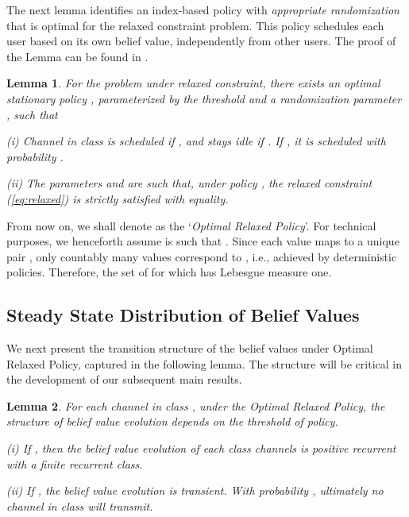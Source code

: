 \documentclass[11pt,twocolumn]{IEEEtran}
\newtheorem{lemma}{Lemma}
\begin{document}
The next lemma identifies an index-based policy with \emph{appropriate randomization} that is optimal for the relaxed constraint problem. This policy schedules each user based on its own belief value, independently from other users. The proof of the Lemma can be found in \cite{Zhao_index}.

\begin{lemma}
\label{lemma:thres_relax}
For the problem under relaxed constraint, there exists an optimal stationary policy , parameterized by the threshold  and a randomization parameter , such that
\vspace{3pt}

\noindent(i) Channel  in class  is scheduled if
, and stays idle
if \hspace{3pt}.
If , it is
scheduled with probability .

\vspace{3pt}

\noindent(ii) The parameters  and  are such that,
under policy , the relaxed constraint (\ref{eq:relaxed}) is
strictly satisfied with equality.

\end{lemma}

From now on, we shall denote  as the `\emph{Optimal Relaxed
Policy}'. {For technical purposes, we henceforth assume  is such that }. Since each  value maps to a unique  pair \cite{Wenzhuo_wiopt}, only countably many  values correspond to , i.e., achieved by deterministic policies. Therefore, the set of  for which  has Lebesgue measure one.

\subsection{Steady State Distribution of Belief Values}

We next present the transition structure of the belief values under
Optimal Relaxed Policy, captured in the following lemma. The
structure will be critical in the development of our subsequent
main results.

\vspace{2pt}

\begin{lemma}
\label{lemma:pos_rec} For each channel in class , under the
Optimal Relaxed Policy, the structure of belief value evolution
depends on the threshold  of policy. \vspace{2pt}

\noindent(i) If , then the belief value evolution of each class  channels is positive recurrent with a finite recurrent class.
\vspace{2pt}

\noindent(ii) If , the belief value evolution is transient. With probability , ultimately no channel in class  will transmit.
\end{lemma}
\end{document}

